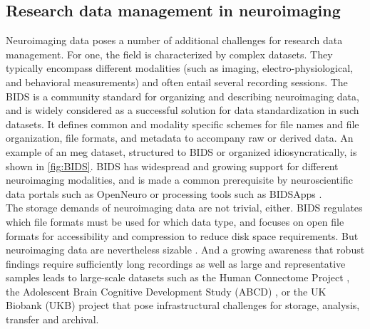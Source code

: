 \subsection{Research data management in neuroimaging}
\label{chap:k1-rdm-2}



Neuroimaging data poses a number of additional challenges for research data management.
For one, the field is characterized by complex datasets.
They typically encompass different modalities (such as imaging, electro-physiological, and behavioral measurements) and often entail several recording sessions.
The \gls{BIDS} \citep{gorgolewski2016brain} is a community standard for organizing and describing neuroimaging data, and is widely considered as a successful solution for data standardization in such datasets.
It defines common and modality specific schemes for file names and file organization, file formats, and metadata to accompany raw or derived data.
An example of an \gls{meg} dataset, structured to \gls{BIDS} or organized idiosyncratically, is shown in \cref{fig:BIDS}.
\gls{BIDS} has widespread and growing support for different neuroimaging modalities, and is made a common prerequisite by neuroscientific data portals such as OpenNeuro \citep{markiewicz2021openneuro} or processing tools such as BIDSApps \citep{gorgolewski2017bids}.\\
The storage demands of neuroimaging data are not trivial, either.
\gls{BIDS} regulates which file formats must be used for which data type, and focuses on open file formats for accessibility and compression to reduce disk space requirements.
But neuroimaging data are nevertheless sizable \citep{van2014human}.
And a growing awareness that robust findings require sufficiently long recordings \citep{li2021moving} as well as large and representative samples \citep{button2013power} \citep{turner2018small} leads to large-scale datasets such as the Human Connectome Project \citep{van2013wu}, the Adolescent Brain Cognitive Development Study (ABCD) \citep{casey2018adolescent}, or the UK Biobank (UKB) project \citep{matthews2015uk} that pose infrastructural challenges for storage, analysis, transfer and archival.

